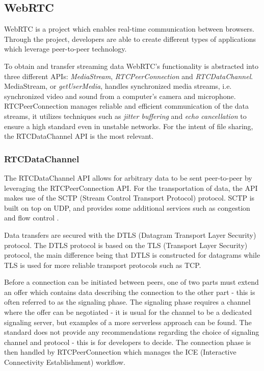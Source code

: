 \subsection{WebRTC}
WebRTC is a project which enables real-time communication between browsers\cite{WebRTC:Online}. Through the project, developers are able to create different types of applications which leverage peer-to-peer technology.

To obtain and transfer streaming data WebRTC's functionality is abstracted into three different APIs: \emph{MediaStream}, \emph{RTCPeerConnection} and \emph{RTCDataChannel}\cite{WebRTCBasics:2012:Online}. MediaStream, or \emph{getUserMedia}, handles synchronized media streams, i.e. synchronized video and sound from a computer's camera and microphone. RTCPeerConnection manages reliable and efficient communication of the data streams, it utilizes techniques such as \emph{jitter buffering} and \emph{echo cancellation} to ensure a high standard even in unstable networks. For the intent of file sharing, the RTCDataChannel API is the most relevant.

\subsubsection{RTCDataChannel}
The RTCDataChannel API allows for arbitrary data to be sent peer-to-peer by leveraging the RTCPeerConnection API. For the transportation of data, the API makes use of the SCTP (Stream Control Transport Protocol) protocol. SCTP is built on top on UDP, and provides some additional services such as congestion and flow control \cite{HighPerfBrowserNetworking:Online}.

Data transfers are secured with the DTLS (Datagram Transport Layer Security) protocol. The DTLS protocol is based on the TLS (Transport Layer Security) protocol, the main difference being that DTLS is constructed for datagrams while TLS is used for more reliable transport protocols such as TCP.

Before a connection can be initiated between peers, one of two parts must extend an offer which contains data describing the connection to the other part - this is often referred to as the signaling phase. The signaling phase requires a channel where the offer can be negotiated - it is usual for the channel to be a dedicated signaling server, but examples of a more serverless approach can be found\cite{webrtcsignalserver}. The standard does not provide any recommendations regarding the choice of signaling channel and protocol - this is for developers to decide. The connection phase is then handled by RTCPeerConnection which manages the ICE (Interactive Connectivity Establishment) workflow.

